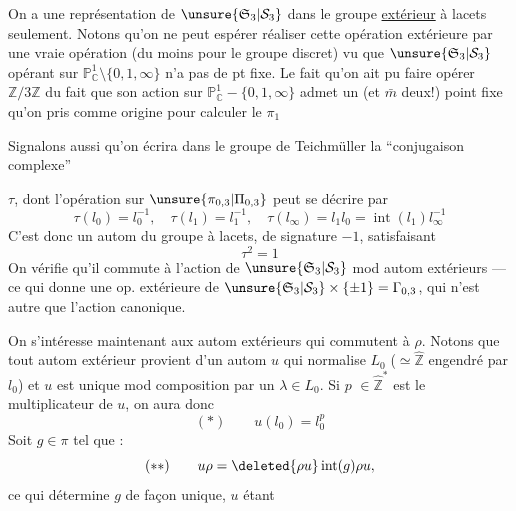 On a une représentation de $\unsure{\mathfrak S_3|\mathcal S_3}$ dans le groupe \uline{extérieur} à lacets seulement. Notons qu'on ne peut espérer réaliser cette opération extérieure par une vraie opération (du moins pour le groupe discret) vu que $\unsure{\mathfrak S_3|\mathcal S_3}$ opérant sur $\mathbb P^1_{\mathbb C}\setminus\{0,1,\infty\}$ n'a pas de pt fixe. Le fait qu'on ait pu faire opérer $\mathbb Z/3\mathbb Z$   du fait que son action sur $\mathbb P^1_{\mathbb C}-\{0,1,\infty\}$ admet un (et $\bar m$ deux!) point fixe qu'on   pris comme origine pour calculer le $\pi_1$

Signalons aussi qu'on écrira dans le groupe de Teichmüller  la ``conjugaison complexe''

$\tau$, dont l'opération sur $\unsure{\pi_{0,3}|\Pi_{0,3}}$ peut se décrire par
\[
\tau(l_0)=l_0^{-1},\quad\tau(l_1)=l_1^{-1},\quad\tau(l_\infty)=l_1l_0=\operatorname{int}(l_1)l_\infty^{-1}
\]
C'est donc un autom du groupe à lacets, de signature $-1$, satisfaisant
\[
\tau^2=1
\]
On vérifie qu'il commute à l'action de $\unsure{\mathfrak S_3|\mathcal S_3}$ mod autom extérieurs --- ce qui donne une op. extérieure de $\unsure{\mathfrak S_3|\mathcal S_3}\times\{\pm1\}=\Gamma_{0,3}$, qui n'est autre que l'action canonique.

On s'intéresse maintenant aux autom extérieurs qui commutent à $\rho$. Notons que tout autom extérieur  provient d'un autom $u$ qui normalise  $L_0$ ($\simeq\hat{\mathbb Z}$ engendré par $l_0$) et $u$ est unique mod composition par un $\lambda\in L_0$. Si $p$  $\in\hat{\mathbb Z}^{*}$  est le multiplicateur de $u$, on aura donc
\[
(*)\qquad u(l_0)=l_0^p
\]
Soit $g\in\pi$ tel que :
\[
(**)\qquad u\rho=\deleted{\rho u}\operatorname{int}(g)\rho u,
\]
ce qui détermine $g$ de façon unique, $u$ étant

